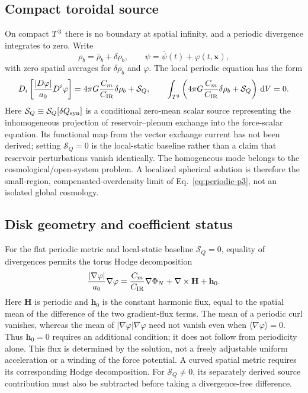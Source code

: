 \subsection{Compact toroidal source}

On compact $T^3$ there is no boundary at spatial infinity, and a periodic
divergence integrates to zero.  Write
\begin{equation}
 \rho_b=\bar\rho_b+\delta\rho_b,
 \qquad
 \psi=\bar\psi(t)+\varphi(t,\mathbf x),
\end{equation}
with zero spatial averages for $\delta\rho_b$ and $\varphi$.  The local
periodic equation has the form
\begin{equation}
 D_i\left[\frac{|D\varphi|}{a_0}D^i\varphi\right]
 =4\pi G\frac{C_m}{C_{\rm IR}}\delta\rho_b+\mathcal S_Q,
 \qquad
 \int_{T^3}\left(4\pi G\frac{C_m}{C_{\rm IR}}
 \delta\rho_b+\mathcal S_Q\right)\,\mathrm d V=0.
 \label{eq:periodic-p3}
\end{equation}
Here $\mathcal S_Q\equiv\mathcal S_Q[\delta Q_{\rm syn}]$ is a conditional
zero-mean scalar source representing the inhomogeneous projection of
reservoir--plenum exchange into the force-scalar equation.  Its functional map from
the vector exchange current has not been derived; setting $\mathcal S_Q=0$ is
the local-static baseline rather than a claim that reservoir perturbations
vanish identically.
The homogeneous mode belongs to the cosmological/open-system problem.  A
localized spherical solution is therefore the small-region,
compensated-overdensity limit of Eq.~\eqref{eq:periodic-p3}, not an isolated
global cosmology.

\subsection{Disk geometry and coefficient status}

For the flat periodic metric and local-static baseline $\mathcal S_Q=0$,
equality of divergences permits the torus Hodge decomposition
\begin{equation}
 \frac{|\nabla\varphi|}{a_0}\nabla\varphi
 =\frac{C_m}{C_{\rm IR}}\nabla\Phi_N+\nabla\times\mathbf H
 +\mathbf h_0.
 \label{eq:curl-field}
\end{equation}
Here $\mathbf H$ is periodic and $\mathbf h_0$ is the constant harmonic flux,
equal to the spatial mean of the difference of the two gradient-flux terms.
The mean of a periodic curl vanishes, whereas the mean of
$|\nabla\varphi|\nabla\varphi$ need not vanish even when
$\langle\nabla\varphi\rangle=0$.  Thus $\mathbf h_0=0$ requires an additional
condition; it does not follow from periodicity alone.  This flux is determined
by the solution, not a freely adjustable uniform acceleration or a winding
of the force potential.  A curved spatial metric requires its corresponding
Hodge decomposition.  For $\mathcal S_Q\ne0$, its separately derived source
contribution must also be subtracted before taking a divergence-free difference.

